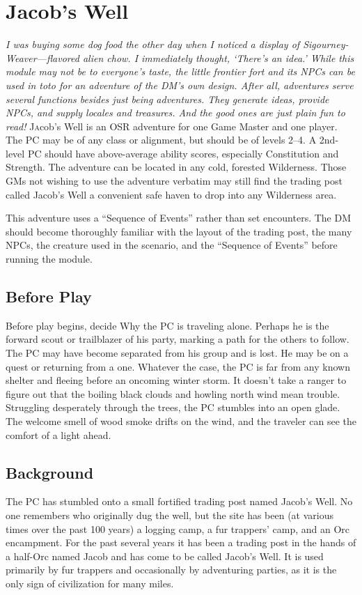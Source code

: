 \documentclass[a5paper,11pt,twoside]{book}
\newcommand{\firstLetter}[1]{\lettrine[loversize=0.3,
lines=3,
slope=-0.1em,
nindent=5pt,
lhang=0.35]{#1}
}
\begin{document}
\chapter{Jacob's Well}


\textit{I was buying some dog food the other day when I noticed a display of Sigourney-Weaver—flavored alien chow.
I immediately thought, ‘There’s an idea.'
While this module may not be to everyone’s taste, the little frontier fort and its NPCs can be used in toto for an adventure of the DM’s own design.
After all, adventures serve several functions besides just being adventures.
They generate ideas, provide NPCs, and supply locales and treasures.
And the good ones are just plain fun to read!}
\firstLetter{J}acob’s Well is an OSR adventure for one Game Master and one player.
The PC may be of any class or alignment, but should be of levels 2--4.
A 2nd- level PC should have above-average ability scores, especially Constitution and Strength.
The adventure can be located in any cold, forested Wilderness.
Those GMs not wishing to use the adventure verbatim may still find the trading post called Jacob’s Well a convenient safe haven to drop into any Wilderness area.

This adventure uses a “Sequence of Events” rather than set encounters.
The DM should become thoroughly familiar with the layout of the trading post, the many NPCs, the creature used in the scenario, and the “Sequence of Events” before running the module.
\section*{Before Play}\label{sec:jacob's-well}

	Before play begins, decide Why the PC is traveling alone.
	Perhaps he is the forward scout or trailblazer of his party, marking a path for the others to follow.
	The PC may have become separated from his group and is lost.
	He may be on a quest or returning from a one.
	Whatever the case, the PC is far from any known shelter and fleeing before an oncoming winter storm.
	It doesn't take a ranger to figure out that the boiling
	black clouds and howling north wind mean trouble.
	Struggling desperately through the trees, the PC stumbles into an open glade.
	The welcome smell of wood smoke drifts on the wind, and the
	traveler can see the comfort of a light	ahead.

\section*{Background}\label{sec:for-the-game-master}
The PC has stumbled onto a small fortified trading post named Jacob’s Well.
No one remembers who originally dug the well, but the site has been (at various times over the past 100 years) a logging camp, a fur trappers’ camp, and an Orc encampment.
For the past several years it has been a trading post in the hands of a half-Orc named Jacob and has come to be called Jacob’s Well.
It is used primarily by fur trappers and occasionally by adventuring parties, as it is the only sign of civilization for many miles.
\end{document}

